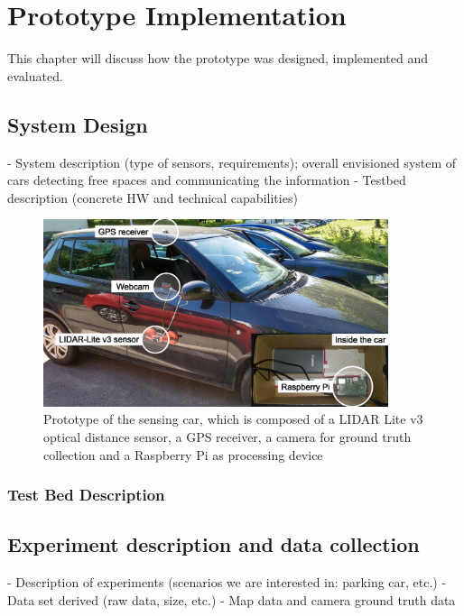 \chapter{Prototype Implementation}
\label{chap:referenceimplementation}

This chapter will discuss how the prototype was designed, implemented and evaluated. 

\section{System Design}
\label{sec:system_design}
- System description (type of sensors, requirements); overall envisioned system of
cars detecting free spaces and communicating the information
- Testbed description (concrete HW and technical capabilities)

\begin{figure}
	\centering
	\includegraphics[width=0.9\textwidth]{img/car.jpg}
	\caption{Prototype of the sensing car, which is composed of a LIDAR Lite v3 optical distance sensor, a GPS receiver, a camera for ground truth collection and a Raspberry Pi as processing device}
	\label{fig:sensing_car}
\end{figure}

\subsection{Test Bed Description}
\label{sec:test_bed}

\section{Experiment description and data collection}
\label{sec:experiment_description_data_collection}
- Description of experiments (scenarios we are interested in: parking car, etc.)
- Data set derived (raw data, size, etc.)
- Map data and camera ground truth data

